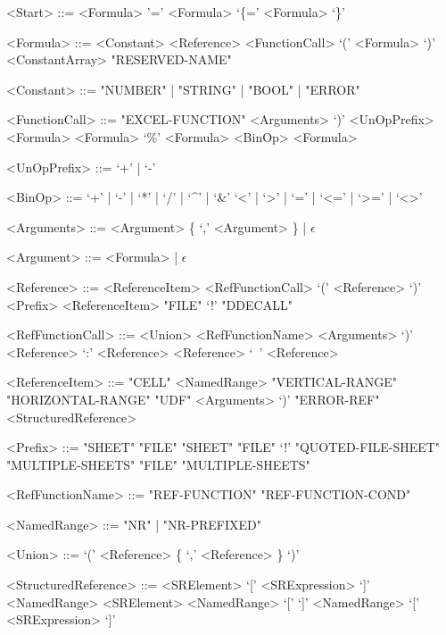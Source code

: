 \begin{grammar}
<Start> ::= <Formula>
	\alt '=' <Formula>
	\alt `\{=' <Formula> `\}'

<Formula> ::= <Constant>
         \alt <Reference>
         \alt <FunctionCall>
         \alt `(' <Formula> `)'
         \alt <ConstantArray>
         \alt "RESERVED-NAME"
         
<Constant> ::= "NUMBER" | "STRING" | "BOOL" | "ERROR"
         
<FunctionCall> ::= "EXCEL-FUNCTION" <Arguments> `)'
		\alt <UnOpPrefix> <Formula>
		\alt <Formula> `\%'
		\alt <Formula> <BinOp> <Formula>
		
<UnOpPrefix> ::= `+' | `-'

<BinOp> ::= `+' | `-' | `*' | `/' | `\textasciicircum' | `\&'
	\alt `<' | `>' | `=' | `<=' | `>=' | `<>'

	
<Arguments> ::= <Argument> \{ `,' <Argument> \} | $\epsilon$

<Argument> ::= <Formula> | $\epsilon$

<Reference> ::= <ReferenceItem>
    \alt <RefFunctionCall>
	\alt `(' <Reference> `)' 
	\alt <Prefix> <ReferenceItem>
	\alt "FILE" `!' "DDECALL"

<RefFunctionCall> ::= <Union>
    \alt <RefFunctionName> <Arguments> `)'
    \alt <Reference> `:' <Reference>
	\alt <Reference> `\ ' <Reference>
    
<ReferenceItem> ::= "CELL"
	\alt <NamedRange>
	\alt "VERTICAL-RANGE"
	\alt "HORIZONTAL-RANGE"
	\alt "UDF" <Arguments> `)'
	\alt "ERROR-REF"
	\alt <StructuredReference>
	
<Prefix> ::= "SHEET"
	\alt "FILE" "SHEET"
	\alt "FILE" `!'
	\alt "QUOTED-FILE-SHEET"
	\alt "MULTIPLE-SHEETS"
	\alt "FILE" "MULTIPLE-SHEETS"

<RefFunctionName> ::= "REF-FUNCTION"
			\alt "REF-FUNCTION-COND"
	
<NamedRange> ::= "NR" | "NR-PREFIXED"

<Union> ::= `(' <Reference> \{ `,' <Reference> \} `)'

<StructuredReference> ::= <SRElement>
	\alt `[' <SRExpression> `]'
	\alt <NamedRange> <SRElement>
	\alt <NamedRange> `[' `]'
	\alt <NamedRange> `[' <SRExpression> `]'



\end{grammar}
